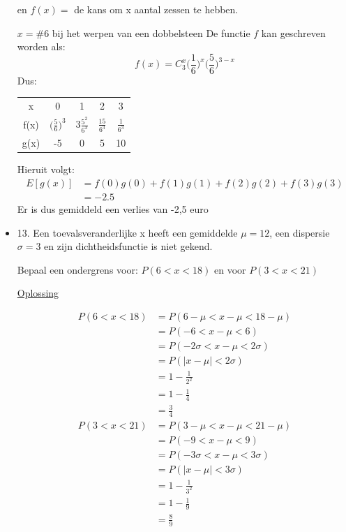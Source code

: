 \documentclass[12pt]{report}
\newcommand{\exercise}[2]{
  #1
  

  \underline{Oplossing}
  
  #2
  
    \hrulefill
}
\begin{document}
\begin{itemize}
{{        en $f(x) = $ de kans om x aantal zessen te hebben.
        
        $x = \#6 $ bij het werpen van een dobbelsteen 
        De functie $f$ kan geschreven worden als:
        $$f(x) = C_{3}^{x}\bigg(\frac{1}{6}\bigg)^x \bigg(\frac{5}{6}\bigg)^{3-x}$$
        Dus:
        \begin{tabular}{c | c c c c}
            x & 0 & 1& 2& 3 \\
            f(x) & $\big(\frac{5}{6}\big)^3$ & $3\frac{5^2}{6^3}$ & $\frac{15}{6^3}$ & $\frac{1}{6^3}$ \\
            g(x) & -5 & 0 & 5 & 10
        \end{tabular}
        Hieruit volgt:
        \begin{equation*}
         \begin{split}
          E[g(x)] & = f(0)g(0) + f(1)g(1) + f(2)g(2) + f(3)g(3) \\
                  & = -2.5
         \end{split}
        \end{equation*}
        Er is dus gemiddeld een verlies van -2,5 euro
    }
}
\item {
    \exercise{
        13. Een toevalsveranderlijke x heeft een gemiddelde $\mu = 12$, een dispersie $\sigma = 3$ en zijn dichtheidsfunctie is niet gekend.
        
        Bepaal een ondergrens voor: $P(6 < x < 18)$ en voor $P(3 < x < 21)$
    }{
        \begin{equation*}
         \begin{split}
          P(6 < x < 18) & = P(6 - \mu < x - \mu < 18 - \mu) \\
                        & = P(-6 < x - \mu < 6) \\
                        & = P(-2\sigma < x - \mu < 2\sigma) \\
                        & = P(|x - \mu| < 2\sigma) \\
                        & = 1 - \frac{1}{2^2} \\
                        & = 1 - \frac{1}{4} \\
                        & = \frac{3}{4}
         \end{split}
        \end{equation*}
        \begin{equation*}
         \begin{split}
          P(3 < x < 21) & = P(3 - \mu < x - \mu < 21 - \mu) \\
                        & = P(-9 < x - \mu < 9) \\
                        & = P(-3\sigma < x - \mu < 3\sigma) \\
                        & = P(|x - \mu| < 3\sigma) \\
                        & = 1 - \frac{1}{3^2} \\
                        & = 1 - \frac{1}{9} \\
                        & = \frac{8}{9}
         \end{split}
        \end{equation*}

}}
\end{itemize}
\end{document}
